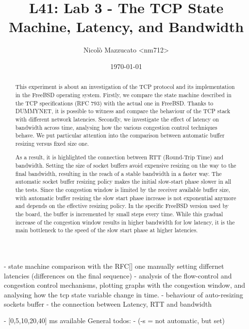 \documentclass[a4paper,10pt]{article}
\begin{document}
\title{L41: Lab 3 - The TCP State Machine, Latency, and Bandwidth}
\author{Nicolò Mazzucato \textless{}nm712\textgreater{}}
\date{\today}

\maketitle

\thispagestyle{empty}

\begin{abstract}           
   This experiment is about an investigation of the TCP protocol and its implementation in the FreeBSD operating system. Firstly, we compare the state machine described in the TCP specifications (RFC 793\cite{RFC793}) with the actual one in FreeBSD. Thanks to DUMMYNET, it is possible to witness and compare the behaviour of the TCP stack with different network latencies. Secondly, we investigate the effect of latency on bandwidth across time, analysing how the various congestion control techniques behave. We put particular attention into the comparison between automatic buffer resizing versus fixed size one.

   As a result, it is highlighted the connection between RTT (Round-Trip Time) and bandwidth.  Setting the size of socket buffers avoid expensive resizing on the way to the final bandwidth, resulting in the reach of a stable bandwidth in a faster way. The automatic socket buffer resizing policy makes the initial slow-start phase slower in all the tests. Since the congestion window is limited by the receiver available buffer size, with automatic buffer resizing the slow start phase increase is not exponential anymore and depends on the effective resizing policy. In the specific FreeBSD version used by the board, the buffer is incremented by small steps every time. While this gradual increase of the congestion window results in higher bandwidth for low latency, it is the main bottleneck to the speed of the slow start phase at higher latencies.
\end{abstract}

\iffalse
- state machine comparison with the RFC[] one manually setting differnet latencies (differences on the final sequence)
   - analysis of the flow-control and congestion control mechanisms, plotting graphs with the congestion window, and analysing how the tcp state variable change in time.
   - behaviour of auto-resizing sockets buffer
   - the connection between Latency, RTT and bandwidth

- [0,5,10,20,40] ms available
General todos:
- (-s = not automatic, but set)
\end{document}
